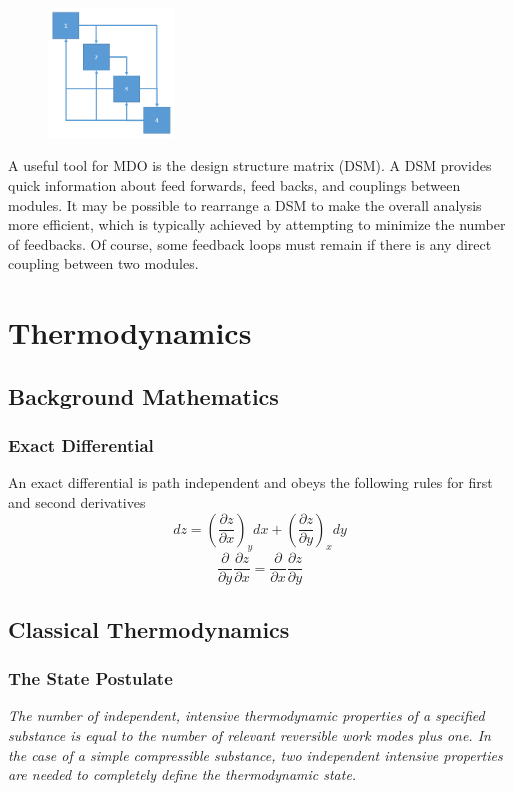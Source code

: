 \documentclass[11pt]{article}
\newcommand{\Partial}[2]{\frac{\partial #1}{\partial #2}}
\newcommand{\PartialConst}[3]{\left(\Partial{#1}{#2}\right)_{#3}}
\begin{document}
\begin{figure}\centering\includegraphics[width=0.3\textwidth]{Graphics/simple_DSM.PNG}\end{figure}
A useful tool for MDO is the design structure matrix (DSM). A DSM provides quick information about feed forwards, feed backs, and couplings between modules. It may be possible to rearrange a DSM to make the overall analysis more efficient, which is typically achieved by attempting to minimize the number of feedbacks. Of course, some feedback loops must remain if there is any direct coupling between two modules.


\newpage
\section{Thermodynamics}
\subsection{Background Mathematics}
\subsubsection{Exact Differential}
An exact differential is path independent and obeys the following rules for first and second derivatives
$$dz = \PartialConst{z}{x}{y}dx + \PartialConst{z}{y}{x}dy$$
$$\Partial{}{y}\Partial{z}{x} = \Partial{}{x}\Partial{z}{y}$$

\subsection{Classical Thermodynamics}
\subsubsection{The State Postulate}
\large\emph{The number of independent, intensive thermodynamic properties of a specified substance is equal to the number of relevant reversible work modes plus one. In the case of a simple compressible substance, two independent intensive properties are needed to completely define the thermodynamic state.}\\\normalsize
\end{document}
